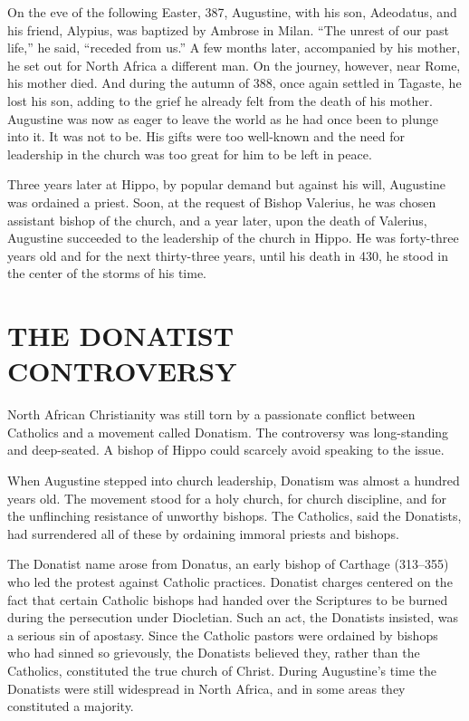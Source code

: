 On the eve of the following Easter, 387, Augustine, with his son, Adeodatus, and his friend,
Alypius, was baptized by Ambrose in Milan. “The unrest of our past life,” he said, “receded from
us.” A few months later, accompanied by his mother, he set out for North Africa a different man. On
the journey, however, near Rome, his mother died. And during the autumn of 388, once again settled
in Tagaste, he lost his son, adding to the grief he already felt from the death of his mother.
Augustine was now as eager to leave the world as he had once been to plunge into it. It was not to
be. His gifts were too well-known and the need for leadership in the church was too great for him to
be left in peace.

Three years later at Hippo, by popular demand but against his will, Augustine was ordained a priest.
Soon, at the request of Bishop Valerius, he was chosen assistant bishop of the church, and a year
later, upon the death of Valerius, Augustine succeeded to the leadership of the church in Hippo. He
was forty-three years old and for the next thirty-three years, until his death in 430, he stood in
the center of the storms of his time.

\section{THE DONATIST CONTROVERSY}

North African Christianity was still torn by a passionate conflict between Catholics and a movement
called Donatism. The controversy was long-standing and deep-seated. A bishop of Hippo could scarcely
avoid speaking to the issue.

When Augustine stepped into church leadership, Donatism was almost a hundred years old. The movement
stood for a holy church, for church discipline, and for the unflinching resistance of unworthy
bishops. The Catholics, said the Donatists, had surrendered all of these by ordaining immoral
priests and bishops.

The Donatist name arose from Donatus, an early bishop of Carthage (313–355) who led the protest
against Catholic practices. Donatist charges centered on the fact that certain Catholic bishops had
handed over the Scriptures to be burned during the persecution under Diocletian. Such an act, the
Donatists insisted, was a serious sin of apostasy. Since the Catholic pastors were ordained by
bishops who had sinned so grievously, the Donatists believed they, rather than the Catholics,
constituted the true church of Christ. During Augustine’s time the Donatists were still widespread
in North Africa, and in some areas they constituted a majority.

